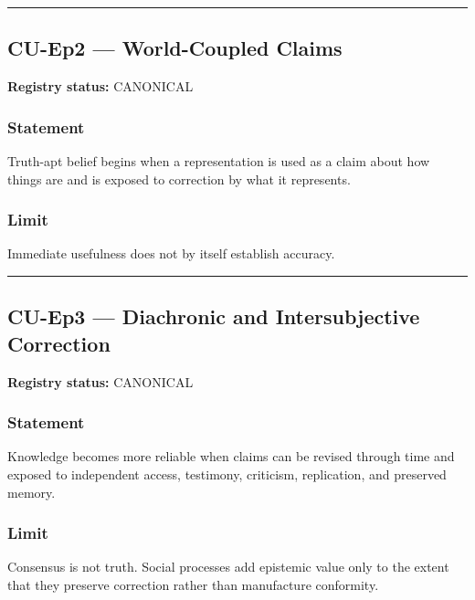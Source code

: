 \documentclass[
  11pt,
]{article}
\begin{document}
\begin{center}\rule{0.5\linewidth}{0.5pt}\end{center}

\subsection{CU-Ep2 --- World-Coupled
Claims}\label{cu-ep2-world-coupled-claims}

\textbf{Registry status:} CANONICAL

\subsubsection{Statement}\label{statement-36}

Truth-apt belief begins when a representation is used as a claim about
how things are and is exposed to correction by what it represents.

\subsubsection{Limit}\label{limit-2}

Immediate usefulness does not by itself establish accuracy.

\begin{center}\rule{0.5\linewidth}{0.5pt}\end{center}

\subsection{CU-Ep3 --- Diachronic and Intersubjective
Correction}\label{cu-ep3-diachronic-and-intersubjective-correction}

\textbf{Registry status:} CANONICAL

\subsubsection{Statement}\label{statement-37}

Knowledge becomes more reliable when claims can be revised through time
and exposed to independent access, testimony, criticism, replication,
and preserved memory.

\subsubsection{Limit}\label{limit-3}

Consensus is not truth. Social processes add epistemic value only to the
extent that they preserve correction rather than manufacture conformity.
\end{document}
